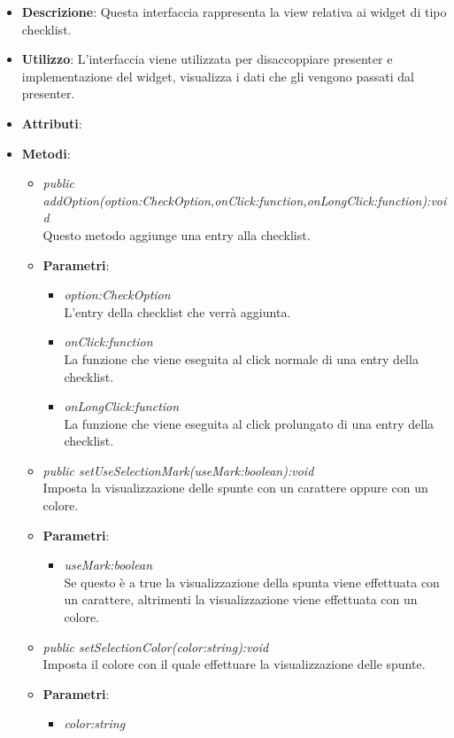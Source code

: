 \begin{itemize}
\item \textbf{Descrizione}: Questa interfaccia rappresenta la view relativa ai widget di tipo checklist.
\item \textbf{Utilizzo}: L'interfaccia viene utilizzata per disaccoppiare presenter e implementazione del widget, visualizza i dati che gli vengono passati dal presenter.
\item \textbf{Attributi}:
\item \textbf{Metodi}:
	\begin{itemize}
	\item \textit{public addOption(option:CheckOption,onClick:function,onLongClick:function):void}\\
	Questo metodo aggiunge una entry alla checklist.
		\item{\textbf{Parametri}: \begin{itemize}
		\item \textit{option:CheckOption}\\
		L'entry della checklist che verrà aggiunta.
		\item \textit{onClick:function}\\
		La funzione che viene eseguita al click normale di una entry della checklist.
		\item \textit{onLongClick:function}\\
		La funzione che viene eseguita al click prolungato di una entry della checklist.
		\end{itemize}}
	\item \textit{public setUseSelectionMark(useMark:boolean):void}\\
	Imposta la visualizzazione delle spunte con un carattere oppure con un colore.
		\item{\textbf{Parametri}: \begin{itemize}
		\item \textit{useMark:boolean}\\
		Se questo è a true la visualizzazione della spunta viene effettuata con un carattere, altrimenti la visualizzazione viene effettuata con un colore.
		\end{itemize}} 
	\item \textit{public setSelectionColor(color:string):void}\\
	Imposta il colore con il quale effettuare la visualizzazione delle spunte.
		\item{\textbf{Parametri}: \begin{itemize}
		\item \textit{color:string}\\

\end{itemize}}
\end{itemize}
\end{itemize}
